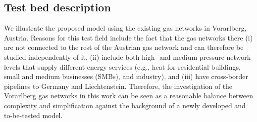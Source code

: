 
\subsection{Test bed description}\label{testbed}
We illustrate the proposed model using the existing gas networks in Vorarlberg, Austria. Reasons for this test field include the fact that the gas networks there (i) are not connected to the rest of the Austrian gas network and can therefore be studied independently of it, (ii) include both high- and medium-pressure network levels that supply different energy services (e.g., heat for residential buildings, small and medium businesses (SMBs), and industry), and (iii) have cross-border pipelines to Germany and Liechtenstein. Therefore, the investigation of the Vorarlberg gas networks in this work can be seen as a reasonable balance between complexity and simplification against the background of a newly developed and to-be-tested model.
 
